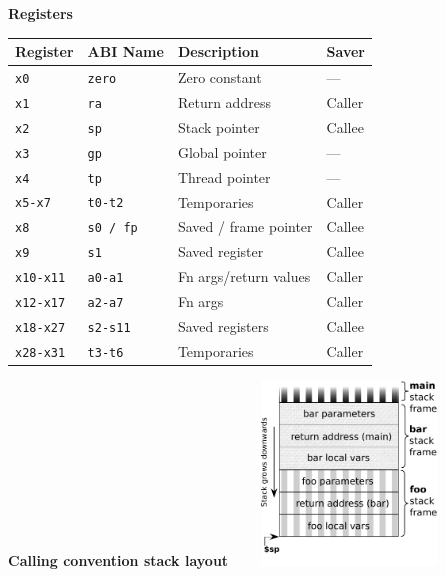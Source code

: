 \begin{multicols}{2}
        
\columnbreak

\textbf{Registers}\\
\begin{tabular} {|l | l | l | l|} \hline
Register     & ABI Name     & Description           & Saver  \\ \hline
\tt{x0}      & \tt{zero}    & Zero constant         & ---    \\
\tt{x1}      & \tt{ra}      & Return address        & Caller \\
\tt{x2}      & \tt{sp}      & Stack pointer         & Callee \\
\tt{x3}      & \tt{gp}      & Global pointer        & ---    \\
\tt{x4}      & \tt{tp}      & Thread pointer        & ---    \\
\tt{x5-x7}   & \tt{t0-t2}   & Temporaries           & Caller \\
\tt{x8}      & \tt{s0 / fp} & Saved / frame pointer & Callee \\
\tt{x9}      & \tt{s1}      & Saved register        & Callee \\
\tt{x10-x11} & \tt{a0-a1}   & Fn args/return values & Caller \\
\tt{x12-x17} & \tt{a2-a7}   & Fn args               & Caller \\
\tt{x18-x27} & \tt{s2-s11}  & Saved registers       & Callee \\
\tt{x28-x31} & \tt{t3-t6}   & Temporaries           & Caller \\ \hline
\end{tabular} 

\vspace{10ex}
\begin{flushright}
    \textbf{Calling convention stack layout$\qquad$}
    \includegraphics[width=0.35\textwidth]{img/call_stack_diagram.pdf}
\end{flushright}
    
\end{multicols}


